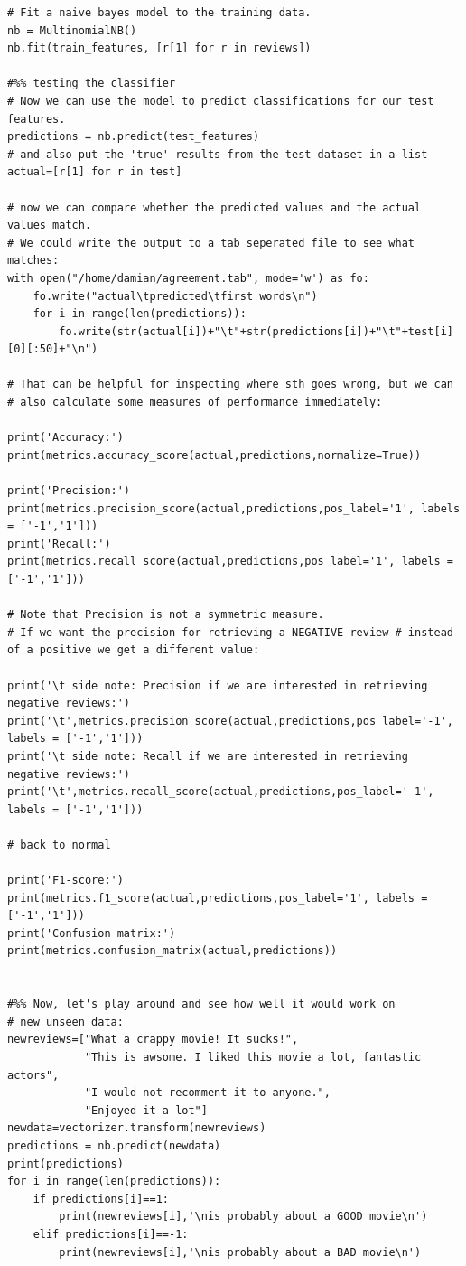 \documentclass[a4paper,12pt]{book}
\begin{document}
\begin{lstlisting}
# Fit a naive bayes model to the training data.
nb = MultinomialNB()
nb.fit(train_features, [r[1] for r in reviews])

#%% testing the classifier
# Now we can use the model to predict classifications for our test features.
predictions = nb.predict(test_features)
# and also put the 'true' results from the test dataset in a list
actual=[r[1] for r in test]

# now we can compare whether the predicted values and the actual values match.
# We could write the output to a tab seperated file to see what matches:
with open("/home/damian/agreement.tab", mode='w') as fo:
    fo.write("actual\tpredicted\tfirst words\n")
    for i in range(len(predictions)):
        fo.write(str(actual[i])+"\t"+str(predictions[i])+"\t"+test[i][0][:50]+"\n")

# That can be helpful for inspecting where sth goes wrong, but we can  
# also calculate some measures of performance immediately:

print('Accuracy:')
print(metrics.accuracy_score(actual,predictions,normalize=True))

print('Precision:')
print(metrics.precision_score(actual,predictions,pos_label='1', labels = ['-1','1']))
print('Recall:')
print(metrics.recall_score(actual,predictions,pos_label='1', labels = ['-1','1']))

# Note that Precision is not a symmetric measure.
# If we want the precision for retrieving a NEGATIVE review # instead of a positive we get a different value:

print('\t side note: Precision if we are interested in retrieving negative reviews:')
print('\t',metrics.precision_score(actual,predictions,pos_label='-1', labels = ['-1','1']))
print('\t side note: Recall if we are interested in retrieving negative reviews:')
print('\t',metrics.recall_score(actual,predictions,pos_label='-1', labels = ['-1','1']))

# back to normal

print('F1-score:')
print(metrics.f1_score(actual,predictions,pos_label='1', labels = ['-1','1']))
print('Confusion matrix:')
print(metrics.confusion_matrix(actual,predictions))


#%% Now, let's play around and see how well it would work on 
# new unseen data:
newreviews=["What a crappy movie! It sucks!",
            "This is awsome. I liked this movie a lot, fantastic actors",
            "I would not recomment it to anyone.",
            "Enjoyed it a lot"]
newdata=vectorizer.transform(newreviews)
predictions = nb.predict(newdata)
print(predictions)
for i in range(len(predictions)):
    if predictions[i]==1:
        print(newreviews[i],'\nis probably about a GOOD movie\n')
    elif predictions[i]==-1:
        print(newreviews[i],'\nis probably about a BAD movie\n')

\end{lstlisting}
\end{document}
